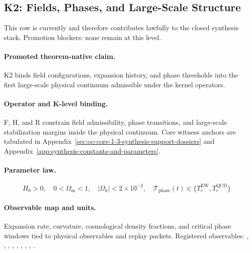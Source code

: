 \subsection{K2: Fields, Phases, and Large-Scale Structure}
\label{sec:oc-core-1-3-synthesis-k2}
This row is currently  and therefore contributes lawfully to the closed synthesis stack.
Promotion blockers: none remain at this level.

\paragraph{Promoted theorem-native claim.}
K2 binds field configurations, expansion history, and phase thresholds into the first large-scale physical continuum admissible under the kernel operators.

\paragraph{Operator and K-level binding.}
F, H, and R constrain field admissibility, phase transitions, and large-scale stabilization margins inside the physical continuum.
Core witness anchors are tabulated in Appendix~\ref{sec:oc-core-1-3-synthesis-support-dossiers} and Appendix~\ref{app:synthesis-constants-and-parameters}.

\paragraph{Parameter law.}
\[
H_0 > 0,\quad 0 < \Omega_{\mathrm{m}} < 1,\quad |\Omega_k| < 2 \times 10^{-3},\quad \mathcal{T}_{\mathrm{phase}}(t) \in \{T_c^{\mathrm{EW}}, T_c^{\mathrm{QCD}}\}
\]

\paragraph{Observable map and units.}
Expansion rate, curvature, cosmological density fractions, and critical phase windows tied to physical observables and replay packets.
Registered observables: , \allowbreak {}, \allowbreak {}, \allowbreak {}, \allowbreak {}, \allowbreak {}, \allowbreak {}, \allowbreak {}, \allowbreak {}.


